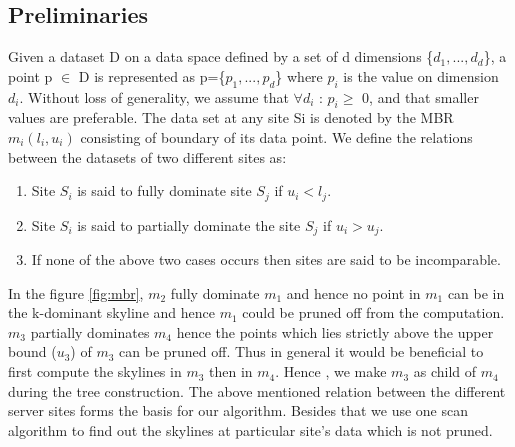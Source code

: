 \documentclass[twocolumn]{article}
\begin{document}
\subsection{Preliminaries}
\label{preliminaries}
Given a dataset D on a data space defined by a set of d dimensions \{\(d_1, ..., d_d\)\}, a point p \(\in\) D is represented as p=\{\(p_1, ..., p_d\)\} where \(p_i\) is the value on dimension \(d_i\). Without loss of generality, we assume that \(\forall d_i\) : \(p_i\geq\)  0, and that smaller values are preferable.
The data set at any site Si is denoted by the MBR \(m_i(l_i,u_i)\) consisting of boundary of its data point.
We define the relations between the datasets of two different sites as:
\begin{enumerate}
\item	Site \(S_i\)  is said to fully dominate site \(S_j\) if \(u_i<l_j\).
\item	Site \(S_i\) is said to partially dominate the site \(S_j\) if \(u_i>u_j\).
\item If none of the above two cases occurs then sites are said            to be incomparable.
\end{enumerate}

In the figure \ref{fig:mbr}, \(m_2\) fully dominate \(m_1\) and hence no point in \(m_1\) can be in the k-dominant skyline and hence \(m_1\) could be pruned off from the computation. \(m_3\) partially dominates \(m_4\) hence the points which lies strictly above the upper bound (\(u_3\)) of \(m_3\) can be pruned off. Thus in general it would be beneficial to first compute the skylines in \(m_3\) then in \(m_4\). Hence , we make \(m_3\) as child of \(m_4\)  during the tree construction. The above mentioned relation between the different server sites forms the basis for our algorithm. Besides that we use one scan algorithm to find out the skylines at particular site’s data which is not pruned.
\end{document}
